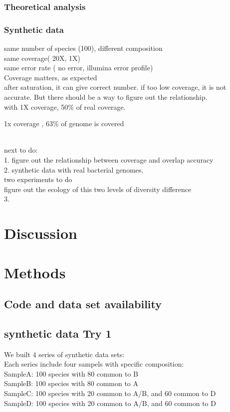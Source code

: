 \documentclass[10pt]{article}
\begin{document}
\subsubsection*{Theoretical analysis}
\subsubsection*{Synthetic data}
same number of species (100), different composition
\\
same coverage( 20X, 1X)
\\
same error rate ( no error, illumina error profile)
\\
Coverage matters, as expected
\\
after saturation, it can give correct number. if too low coverage, it is not accurate.
But there should be a way to figure out the relationship.
\\
with 1X coverage, 50\% of real coverage.

1x coverage , 63\% of genome is covered

\\next to do:
\\
1. figure out the relationship between coverage and overlap accuracy
\\
2. synthetic data with real bacterial genomes.
\\


two experiments to do 
\\
figure out the ecology of this two levels of diversity difference
\\
3. 

\section*{Discussion}




\section*{Methods}

\subsection*{Code and data set availability}

\subsection*{synthetic data Try 1}
We built 4 series of synthetic data sets:\\
Each series include four sampels with specific composition:\\
SampleA: 100 species with 80 common to B\\
SampleB: 100 species with 80 common to A\\
SampleC: 100 species with 20 common to A/B, and 60 common to D\\
SampleD: 100 species with 20 common to A/B, and 60 common to D\\
\end{document}
